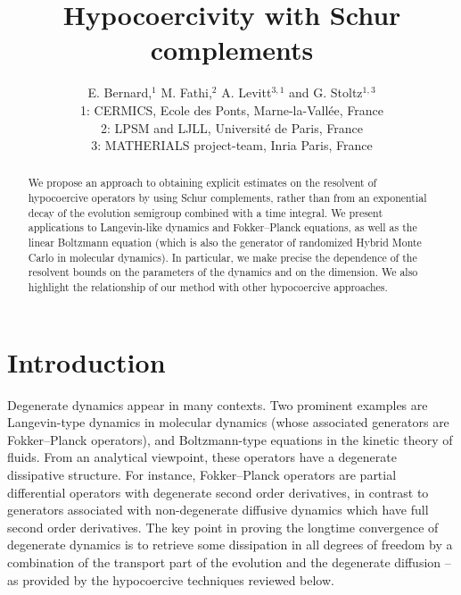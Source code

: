 \documentclass{article}
\begin{document}
  
\title{Hypocoercivity with Schur complements}
\author{E. Bernard,$^1$ M. Fathi,$^2$ A. Levitt$^{3,1}$ and G. Stoltz$^{1,3}$ \\
  \small 1: CERMICS, Ecole des Ponts, Marne-la-Vallée, France \\
  \small 2: LPSM and LJLL, Universit\'e de Paris, France \\
  \small 3: MATHERIALS project-team, Inria Paris, France
}
 
\maketitle

\begin{abstract}
  We propose an approach to obtaining explicit estimates on the resolvent of
  hypocoercive operators by using Schur complements, rather
  than from an exponential decay of the evolution
  semigroup combined with a time integral. We present applications to Langevin-like dynamics and
  Fokker--Planck equations, as well as the linear Boltzmann equation
  (which is also the generator of randomized Hybrid Monte Carlo in
  molecular dynamics). In particular, we make precise the dependence
  of the resolvent bounds on the parameters of the dynamics and on the
  dimension. We also highlight the relationship of our method with
  other hypocoercive approaches.
\end{abstract}

\section{Introduction}

Degenerate dynamics appear in many contexts. Two prominent examples
are Langevin-type dynamics in molecular dynamics (whose associated generators are Fokker--Planck operators), and Boltzmann-type
equations in the kinetic theory of fluids. From an analytical viewpoint,
these operators have a degenerate dissipative structure. For instance, Fokker--Planck operators
are partial differential operators with
degenerate second order derivatives, in contrast to generators associated with non-degenerate diffusive dynamics which have full second order  derivatives. The key point in proving the longtime convergence of degenerate dynamics is to retrieve some dissipation in all degrees of freedom by a combination of the transport part of the evolution and the degenerate diffusion -- as provided by the hypocoercive techniques reviewed below.
\end{document}

